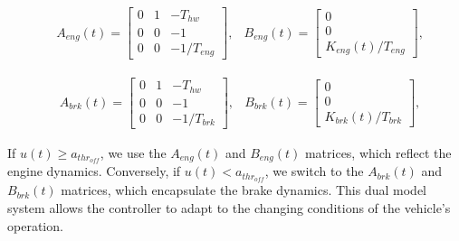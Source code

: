 \documentclass[12pt]{report}
\begin{document}
\[
\begin{aligned}
&A_{eng}(t) = 
\begin{bmatrix}
0 & 1 & -T_{hw} \\
0 & 0 & -1 \\
0 & 0 & -1/T_{eng}
\end{bmatrix}, 
&B_{eng}(t) = 
\begin{bmatrix}
0 \\
0 \\
K_{eng}(t)/T_{eng}
\end{bmatrix}, 
\end{aligned}
\]

\[
\begin{aligned}
&A_{brk}(t) = 
\begin{bmatrix}
0 & 1 & -T_{hw} \\
0 & 0 & -1 \\
0 & 0 & -1/T_{brk}
\end{bmatrix}, 
&B_{brk}(t) = 
\begin{bmatrix}
0 \\
0 \\
K_{brk}(t)/T_{brk}
\end{bmatrix},
\end{aligned}
\]

If \(u(t) \geq a_{thr_{off}}\), we use the \(A_{eng}(t)\) and \(B_{eng}(t)\) matrices, which reflect the engine dynamics. Conversely, if \(u(t) < a_{thr_{off}}\), we switch to the \(A_{brk}(t)\) and \(B_{brk}(t)\) matrices, which encapsulate the brake dynamics. This dual model system allows the controller to adapt to the changing conditions of the vehicle's operation.
\end{document}
